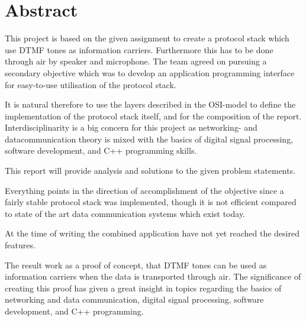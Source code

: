 \chapter*{Abstract}
This project is based on the given assignment to create a protocol stack which
use DTMF tones as information carriers. Furthermore this has to be done through air
by speaker and microphone. The team agreed on pursuing a secondary objective which
was to develop an application programming interface for easy-to-use utilisation of
the protocol stack.

It is natural therefore to use the layers described in the OSI-model to define
the implementation of the protocol stack itself, and for the composition of the report.
Interdisciplinarity is a big concern for this project as networking- and datacommunication
theory is mixed with the basics of digital signal processing, software development,
and C++ programming skills. 

This report will provide analysis and solutions to the given problem statements.


Everything points in the direction of accomplishment of the objective since a fairly stable 
protocol stack was implemented, though it is not efficient compared to state of the art
data communication systems which exist today. 

At the time of writing the combined application have not yet reached the desired features.

The result work as a proof of concept, that DTMF tones can be used as information carriers
when the data is transported through air. The significance of creating this proof has given a
great insight in topics regarding the basics of networking and data communication,
digital signal processing, software development, and C++ programming.